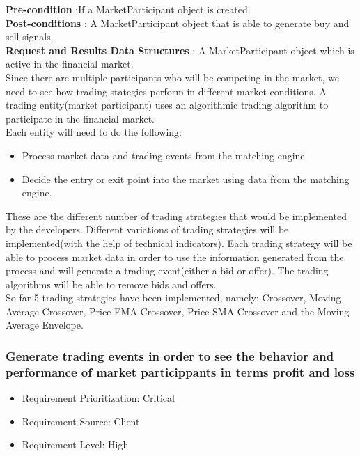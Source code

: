 \documentclass[12pt]{article}
\begin{document}
				\textbf{Pre-condition} :If a MarketParticipant object is created.\\
				\textbf{Post-conditions} : A MarketParticipant object that is able to generate buy and sell signals.\\ 
				\textbf{Request and Results Data Structures} : A MarketParticipant object which is active in the financial market.\\
								
				Since there are multiple participants who will be competing in the market, we need to see how trading stategies perform in different market conditions. A trading entity(market participant) uses an algorithmic trading algorithm to participate in the financial market.\\
				
				Each entity will need to do the following:
				\begin{itemize}
						\item Process market data and trading events from the matching engine
						\item Decide the entry or exit point into the market using data from the matching engine.
				\end{itemize}
					
				These are the different number of trading strategies that would be implemented by the developers. Different variations of trading strategies will be implemented(with the help of technical indicators). Each trading strategy will be able to process market data in order to use the information generated from the process and will generate a trading event(either a bid or offer). The trading algorithms will be able to remove bids and offers.\\
				
				So far 5 trading strategies have been implemented, namely: Crossover, Moving Average Crossover, Price EMA Crossover, Price SMA Crossover and the Moving Average Envelope.
				 
				\subsubsection{Generate trading events in order to see the behavior and performance of market particippants in terms profit and loss}
				\begin{itemize}
					\item Requirement Prioritization: Critical
					\item Requirement Source: Client 	
					\item Requirement Level: High
				\end{itemize}  
				
\end{document}
